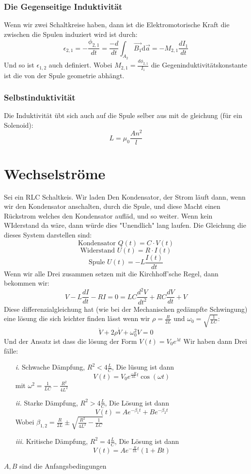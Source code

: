 \documentclass{article}
\begin{document}
\subsubsection*{Die Gegenseitige Induktivität}
Wenn wir zwei Schaltkreise haben, dann ist die Elektromotorische Kraft die zwischen die Spulen induziert wird ist durch:
\[\epsilon_{2,1}=-\frac{\phi_{2,1}}{dt}=\frac{-d }{dt} \int^{}_{A_2}\vec{B_1}\text{d}\vec{a}=-M_{2,1}\frac{dI_1}{dt}\]
Und so ist $\epsilon_{1,2}$ auch definiert. Wobei $M_{2,1}=\frac{d\phi_{2,1}}{I_1}$ die Gegeninduktivitätskonstante ist die von der Spule geometrie abhängt.
\subsubsection*{Selbstinduktivität}
Die Induktivität übt sich auch auf die Spule selber aus mit de gleichung (für ein Solenoid):
\[L=\mu_0 \frac{An^2}{l}\]
\section*{Wechselströme}
Sei ein RLC Schaltkeis.
Wir laden Den Kondensator, der Strom läuft dann, wenn wir den Kondensator anschalten, durch die Spule, und diese Macht einen Rückstrom welches den Kondensator aufläd, und so weiter. Wenn kein WIderstand da wäre, dann würde dies "Unendlich" lang laufen. Die Gleichung die dieses System darstellen sind:
\[\text{Kondensator } Q(t)=C \cdot V(t)\]
\[\text{Widerstand }U(t)=R \cdot I(t)\]
\[\text{Spule } U(t)=-L \frac{I(t)}{dt} \]
Wenn wir alle Drei zusammen setzen mit die Kirchhoff'sche Regel, dann bekommen wir:
\[V-L \frac{dI}{dt}-RI=0=LC \frac{d^2 V}{dt^2}+RC \frac{dV}{dt}+V\]
Diese differenzialgleichung hat (wie bei der Mechanischen gedämpfte Schwingung) eine lösung die sich leichter finden lässt wenn wir $\rho=\frac{R}{2L}$ und $\omega_0=\sqrt{\frac{1}{LC}}$:
\[\ddot{V}+2\rho\dot{V}+\omega_0^2V=0\]
Und der Ansatz ist dass die lösung der Form $V(t)=V_0e^{\lambda t}$
Wir haben dann Drei fälle:
\begin{itemize}
  \item[\textit{i.}]{Schwache Dämpfung, $R^2<4 \frac{L }{C}$, Die lüsung ist dann \[V(t)=V_0e^{\frac{-R}{2L}t}\cos\left(\omega t\right)\] mit $\omega^2= \frac{1}{LC}-\frac{R^2}{4L^2}$}
  \item[\textit{ii.}]{Starke Dämpfung, $R^2> 4 \frac{L }{C}$, Die Lösung ist dann \[V(t)=Ae^{-\beta_1 t}+B e^{-\beta_2 t}\] Wobei $\beta_{1,2}=\frac{R}{2L}\pm \sqrt{\frac{R^2}{4L^2}-\frac{1}{LC}}$}
  \item[\textit{iii.}]{Kritische Dämpfung, $R^2=4 \frac{L }{C }$, Die Lösung ist dann \[V(t)=Ae^{-\frac{R}{2L}t}(1+Bt)\]}
\end{itemize}
$A,B$ sind die Anfangsbedingungen
\end{document}
